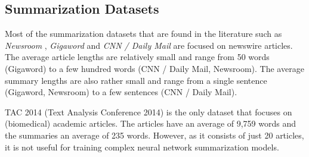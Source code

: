 \documentclass[runningheads]{llncs}
\begin{document}
\subsection{Summarization Datasets}
\label{sec:other_data}
Most of the summarization datasets that are found in the literature such as {\em Newsroom}  \cite{Grusky2018Newsroom:Strategies}, {\em Gigaword}  \cite{Napoles2012AnnotatedGigaword} and {\em CNN / Daily Mail}  \cite{Hermann2015TeachingComprehend} are focused on newswire articles.
The average article lengths are relatively small and range from 50 words (Gigaword) to a few hundred words (CNN / Daily Mail, Newsroom). The average summary lengths are also rather small and range from a single sentence (Gigaword, Newsroom) to a few sentences (CNN / Daily Mail). %

TAC 2014 (Text Analysis Conference 2014) is the only dataset that focuses on (biomedical) academic articles. The articles have an average of 9,759 words and the summaries an average of 235 words. However, as it consists of just 20 articles, it is not useful for training complex neural network summarization models. %

\end{document}
